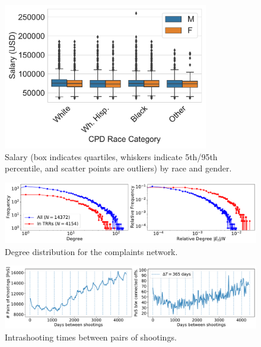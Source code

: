 \begin{figure}[ht!] 
	\begin{center}
	\includegraphics[width=0.8\textwidth]{figs/salary_by_race_gender} 
	\end{center}
	\caption{Salary (box indicates quartiles, whiskers indicate 5th/95th percentile, and scatter points are outliers) by race and gender.} \label{fig:salary_gender_race}
\end{figure}


\begin{figure}[ht!] 
	\includegraphics[width=\textwidth]{figs/degree_distribution} 
	\caption{Degree distribution for the complaints network.}
\label{fig:degree_distribution}
\end{figure}

\begin{figure}[ht!] 
	\includegraphics[width=\textwidth]{figs/intrashooting_times} 
	\caption{Intrashooting times between pairs of shootings.}
\label{fig:intrashooting_time}
\end{figure}




